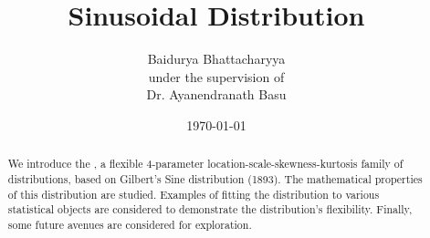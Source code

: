\documentclass[11pt]{article}
\title{Sinusoidal Distribution}
\author{Baidurya Bhattacharyya\\
{\small under the supervision of}\\
{\normalsize Dr. Ayanendranath Basu}}
\date{\today}
\theoremstyle{plain}
\theoremstyle{remark}
\theoremstyle{definition}
\begin{document}
\maketitle

\begin{abstract}
    We introduce the \sindist{}, a flexible 4-parameter location-scale-skewness-kurtosis family of distributions, based on Gilbert's Sine distribution (1893). The mathematical properties of this distribution are studied. Examples of fitting the distribution to various statistical objects are considered to demonstrate the distribution's flexibility. Finally, some future avenues are considered for exploration.
\end{abstract}

\tableofcontents










\printbibliography


\end{document}
